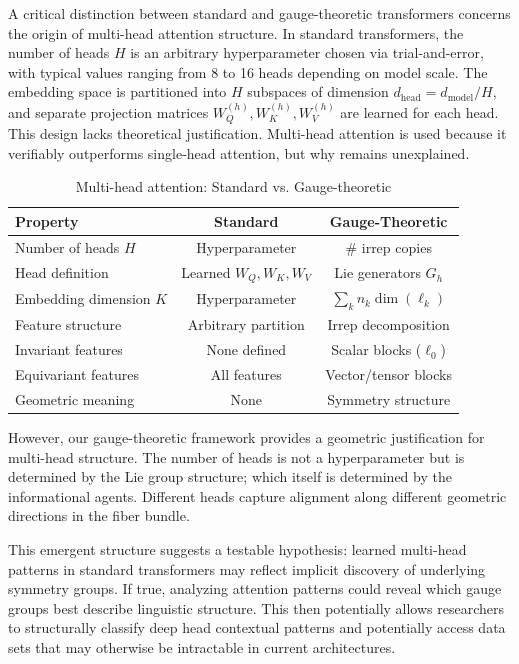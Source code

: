 \documentclass[twoside,11pt]{article}
\begin{document}
A critical distinction between standard and gauge-theoretic transformers concerns the origin of multi-head attention structure. In standard transformers, the number of heads $H$ is an arbitrary hyperparameter chosen via trial-and-error, with typical values ranging from 8 to 16 heads depending on model scale. The embedding space is partitioned into $H$ subspaces of dimension $d_{\text{head}} = d_{\text{model}}/H$, and separate projection matrices $W_Q^{(h)}, W_K^{(h)}, W_V^{(h)}$ are learned for each head. This design lacks theoretical justification. Multi-head attention is used because it verifiably outperforms single-head attention, but why remains unexplained.

\begin{table}[h]
\centering
\caption{Multi-head attention: Standard vs. Gauge-theoretic}
\label{tab:multihead_comparison}
\begin{tabular}{lcc}
\toprule
\textbf{Property} & \textbf{Standard} & \textbf{Gauge-Theoretic} \\
\midrule
Number of heads $H$ & Hyperparameter & \# irrep copies \\
Head definition & Learned $W_Q, W_K, W_V$ & Lie generators $G_h$ \\
Embedding dimension $K$ & Hyperparameter & $\sum_k n_k \dim(\ell_k)$ \\
Feature structure & Arbitrary partition & Irrep decomposition \\
Invariant features & None defined & Scalar blocks ($\ell_0$) \\
Equivariant features & All features & Vector/tensor blocks \\
Geometric meaning & None & Symmetry structure \\
\bottomrule
\end{tabular}
\end{table}

However, our gauge-theoretic framework provides a geometric justification for multi-head structure. The number of heads is not a hyperparameter but is determined by the Lie group structure; which itself is determined by the informational agents. Different heads capture alignment along different geometric directions in the fiber bundle.

This emergent structure suggests a testable hypothesis: learned multi-head patterns in standard transformers may reflect implicit discovery of underlying symmetry groups. If true, analyzing attention patterns could reveal which gauge groups best describe linguistic structure.  This then potentially allows researchers to structurally classify deep head contextual patterns and potentially access data sets that may otherwise be intractable in current architectures.
\end{document}
